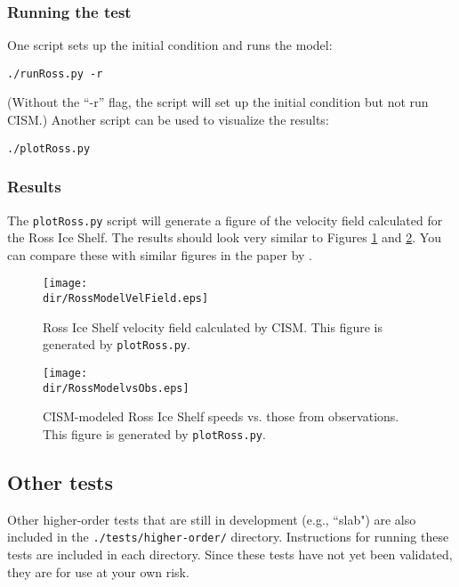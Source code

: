 \subsubsection{Running the test}
One script sets up the initial condition and runs the model:

\texttt{./runRoss.py -r}

\noindent
(Without the ``-r'' flag, the script will set up the initial condition but not run CISM.)
Another script can be used to visualize the results:

\texttt{./plotRoss.py}

\subsubsection{Results}
The \texttt{plotRoss.py} script will generate a figure of the velocity field
calculated for the Ross Ice Shelf.  The results should look very similar to Figures \ref{fig:rossresults1} and \ref{fig:rossresults2}. You can
compare these with similar figures in the paper by \citet{MacAyeal:1996vn}.

\begin{figure}[H!]
	\centering
	\texttt{[image: \\dir/RossModelVelField.eps]}
	\caption{Ross Ice Shelf velocity field calculated by CISM. This figure is generated by \texttt{plotRoss.py}.}
	\label{fig:rossresults1}
\end{figure}

\begin{figure}[H!]
	\centering
	\texttt{[image: \\dir/RossModelvsObs.eps]}
	\caption{CISM-modeled Ross Ice Shelf speeds vs. those from observations. This figure is generated by \texttt{plotRoss.py}.}
	\label{fig:rossresults2}
\end{figure}
\FloatBarrier


\subsection{Other tests}
Other higher-order tests that are still in development (e.g., ``slab") are also included in the \texttt{./tests/higher-order/}
directory. Instructions for running these tests are included in each directory. Since these tests have not yet been validated, 
they are for use at your own risk.


